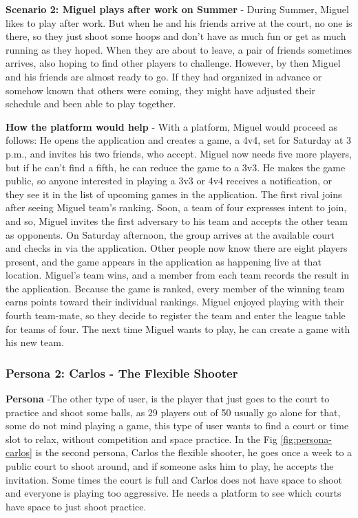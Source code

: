 \textbf{Scenario 2: Miguel plays after work on Summer} - During Summer, Miguel likes to play after work. But when he and his friends arrive at the court, no one is there, so they just shoot some hoops and don’t have as much fun or get as much running as they hoped. When they are about to leave, a pair of friends sometimes arrives, also hoping to find other players to challenge. However, by then Miguel and his friends are almost ready to go. If they had organized in advance or somehow known that others were coming, they might have adjusted their schedule and been able to play together.

\textbf{How the platform would help} - With a platform, Miguel would proceed as follows: He opens the application and creates a game, a 4v4, set for Saturday at 3 p.m., and invites his two friends, who accept. Miguel now needs five more players, but if he can’t find a fifth, he can reduce the game to a 3v3. He makes the game public, so anyone interested in playing a 3v3 or 4v4 receives a notification, or they see it in the list of upcoming games in the application. The first rival joins after seeing Miguel team’s ranking. Soon, a team of four expresses intent to join, and so, Miguel invites the first adversary to his team and accepts the other team as opponents.
On Saturday afternoon, the group arrives at the available court and checks in via the application. Other people now know there are eight players present, and the game appears in the application as happening live at that location. Miguel’s team wins, and a member from each team records the result in the application. Because the game is ranked, every member of the winning team earns points toward their individual rankings. Miguel enjoyed playing with their fourth team-mate, so they decide to register the team and enter the league table for teams of four. The next time Miguel wants to play, he can create a game with his new team.

\subsubsection{Persona 2: Carlos - The Flexible Shooter}
\label{subsec:rp-carlos}


\textbf{Persona} -The other type of user, is the player that just goes to the court to practice and shoot some balls, as 29 players out of 50 usually go alone for that, some do not mind playing a game, this type of user wants to find a court or time slot to relax, without competition and space practice. In the Fig \ref{fig:persona-carlos} is the second persona, Carlos the flexible shooter, he goes once a week to a public court to shoot around, and if someone asks him to play, he accepts the invitation. Some times the court is full and Carlos does not have space to shoot and everyone is playing too aggressive. He needs a platform to see which courts have space to just shoot practice. 


